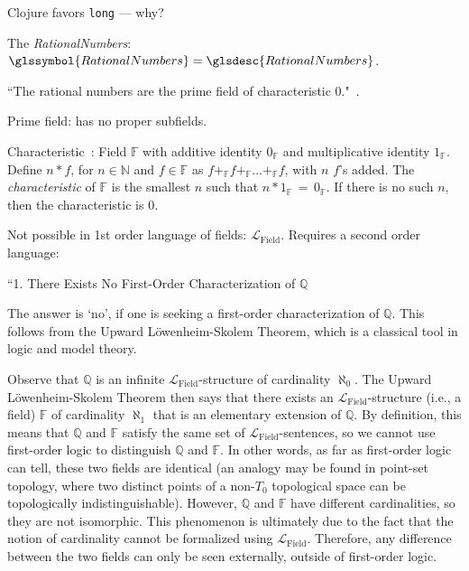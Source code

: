 Clojure favors \texttt{long} --- why?

\label{sec:BigInteger}

\label{sec:Rational-numbers}

The \textit{\gls{RationalNumbers}}: 
$\glssymbol{RationalNumbers} = \glsdesc{RationalNumbers}$.

\label{sec:Axiomatic_definition_of_Q}

``The rational numbers are the prime field of characteristic 
0."~\cite{quora:Rational_axioms}.

Prime field: has no proper subfields.

Characteristic~\cite{wiki:Field_mathematics}: 
Field $\mathbb{F}$ with additive identity $0_{\mathbb{F}}$
and multiplicative identity $1_{\mathbb{F}}$.
Define $n \ast f$, for $n \in \mathbb{N}$ and $f \in \mathbb{F}$
as $f +_{\mathbb{F}} f +_{\mathbb{F}} \ldots +_{\mathbb{F}} f$, 
with $n$ $f$'s added.
The \textit{characteristic} of $\mathbb{F}$
is the smallest $n$ such that 
$n \ast 1_{\mathbb{F}} \,=\, 0_{\mathbb{F}}$.
If there is no such $n$, then the characteristic is 
$0$.


Not possible in 1st order language of fields:
$ \mathcal{L}_{\text{Field}} $.
Requires a second order language:


``1. There Exists No First-Order Characterization of $ \mathbb{Q} $

The answer is ‘no’, if one is seeking a first-order 
characterization of $ \mathbb{Q} $. 
This follows from the Upward Löwenheim-Skolem Theorem, 
which is a classical tool in logic and model theory.

Observe that $ \mathbb{Q} $ is an infinite 
$ \mathcal{L}_{\text{Field}} $-structure 
of cardinality $ \aleph_{0} $. 
The Upward L\"{o}wenheim-Skolem Theorem then says that 
there exists an $ \mathcal{L}_{\text{Field}} $-structure 
(i.e., a field) $ \mathbb{F} $ of cardinality $ \aleph_{1} $ 
that is an elementary extension of $ \mathbb{Q} $. 
By definition, this means that $ \mathbb{Q} $ and $ \mathbb{F} $ 
satisfy the same set of $ \mathcal{L}_{\text{Field}} $-sentences, 
so we cannot use first-order logic to distinguish $ \mathbb{Q} $ 
and $ \mathbb{F} $. In other words, as far as first-order logic 
can tell, these two fields are identical
(an analogy may be found in point-set topology,
where two distinct points of a non-$ T_{0} $ topological space 
can be topologically indistinguishable). 
However, $ \mathbb{Q} $ and $ \mathbb{F} $ have different 
cardinalities, so they are not isomorphic. 
This phenomenon is ultimately due to the fact 
that the notion of cardinality cannot be formalized
 using $ \mathcal{L}_{\text{Field}} $. 
 Therefore, any difference between the two fields 
 can only be seen externally, outside of first-order logic.

